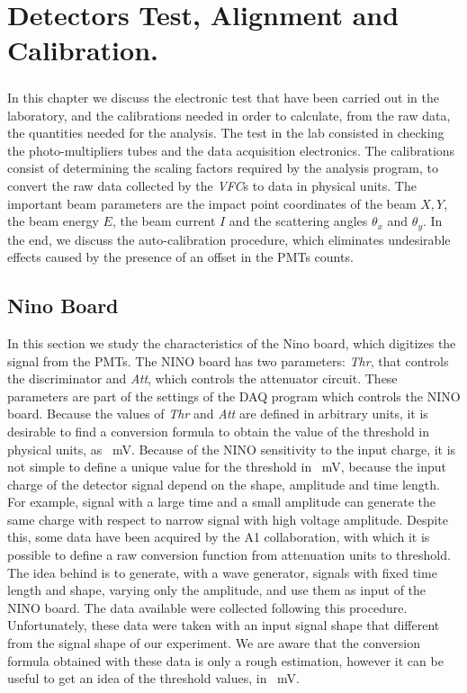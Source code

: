 \chapter{Detectors Test, Alignment and Calibration.} \label{analysis}

\paragraph{}
In this chapter we discuss the electronic test that have been carried out in the laboratory, and the calibrations needed in order to calculate, from the raw data, the quantities needed for the analysis.
The test in the lab consisted in checking the photo-multipliers tubes and the data acquisition electronics. The calibrations consist of determining the scaling factors required by the analysis program, to convert the raw data collected by the \textit{VFC}s to data in physical units. The important beam parameters are the impact point coordinates of the beam $X,Y$, the beam energy $E$, the beam current $I$ and the scattering angles $\theta_{x}$ and $\theta_{y}$. In the end, we discuss the auto-calibration procedure, which eliminates undesirable effects caused by the presence of an offset in the PMTs counts.

\section{Nino Board}

In this section we study the characteristics of the Nino board, which digitizes the signal from the PMTs. The NINO board has two parameters: \textit{Thr}, that controls the discriminator and \textit{Att}, which controls the attenuator circuit. These parameters are part of the settings of the DAQ program which controls the NINO board.
Because the values of \textit{Thr} and \textit{Att} are defined in arbitrary units, it is desirable to find a conversion formula to obtain the value of the threshold in physical units, as \SI{}{\milli \volt}.
Because of the NINO sensitivity to the input charge, it is not simple to define a unique value for the threshold in \SI{}{\milli \volt}, because the input charge of the detector signal depend on the shape, amplitude and time length. For example, signal with a large time and a small amplitude can generate the same charge with respect to narrow signal with high voltage amplitude. Despite this, some data have been acquired by the A1 collaboration, with which it is possible to define a raw conversion function from attenuation units to threshold. The idea behind  is to generate, with a wave generator, signals with fixed time length and shape, varying only the amplitude, and use them as input of the NINO board.
The data available were collected following this procedure. Unfortunately, these data were taken with an input signal shape that different from the signal shape of our experiment. We are aware that the conversion formula obtained with these data is only a rough estimation, however it can be useful to get an idea of the threshold values, in \SI{}{\milli \volt}.

